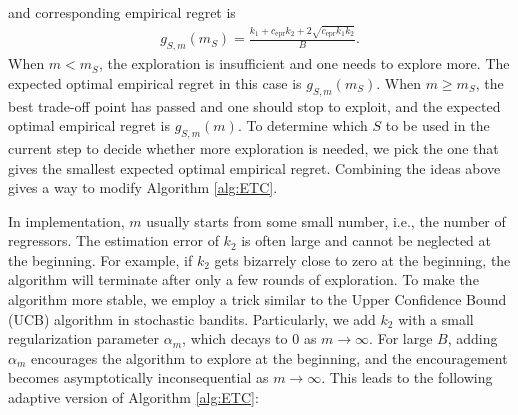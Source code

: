\documentclass[a4paper,11pt]{article}
\numberwithin{equation}{section}
\theoremstyle{plain}
\theoremstyle{definition}
\def\ex{{\text{epr}}}
\begin{document}
and corresponding empirical regret is 
\begin{align}
g_{S,m}(m_S) = \frac{k_1+c_{\ex}k_2+2\sqrt{c_{\ex}k_1k_2}}{B}.\label{kaka}
\end{align} 
When $m< m_S$, the exploration is insufficient and one needs to explore more. The expected optimal empirical regret in this case is $g_{S,m}(m_S)$. 
When $m\geq m_S$, the best trade-off point has passed and one should stop to exploit, and the expected optimal empirical regret is $g_{S,m}(m)$. 
To determine which $S$ to be used in the current step to decide whether more exploration is needed, we pick the one that gives the smallest expected optimal empirical regret.
Combining the ideas above gives a way to modify Algorithm \ref{alg:ETC}. 


In implementation, $m$ usually starts from some small number, i.e., the number of regressors. The estimation error of $k_2$ is often large and cannot be neglected at the beginning. 
For example, if $k_2$ gets bizarrely close to zero at the beginning, the algorithm will terminate after only a few rounds of exploration.   
To make the algorithm more stable, we employ a trick similar to the Upper Confidence Bound (UCB) algorithm \cite{auer2002finite} in stochastic bandits. 
Particularly, we add $k_2$ with a small regularization parameter $\alpha_m$, which decays to $0$ as $m\to\infty$. 
For large $B$, adding $\alpha_m$ encourages the algorithm to explore at the beginning, and the encouragement becomes asymptotically inconsequential as $m\to\infty$.  
This leads to the following adaptive version of Algorithm \ref{alg:ETC}:
\end{document}
